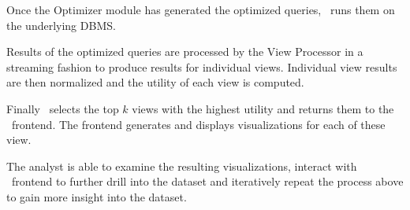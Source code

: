 Once the Optimizer module has generated the
optimized queries, \SeeDB\ runs them on the underlying DBMS.


Results of the optimized queries are processed by the View Processor in a
streaming fashion to produce results for individual views. Individual view
results are then normalized and the utility of each view is computed.


Finally \SeeDB\ selects the top $k$ views with the highest utility and returns
them to the \SeeDB\ frontend. The frontend generates 
and displays visualizations for each of these view. 

The analyst is able to examine the resulting visualizations, interact with \SeeDB\ frontend to further drill into the dataset and iteratively repeat the process above to gain more insight into the dataset. 